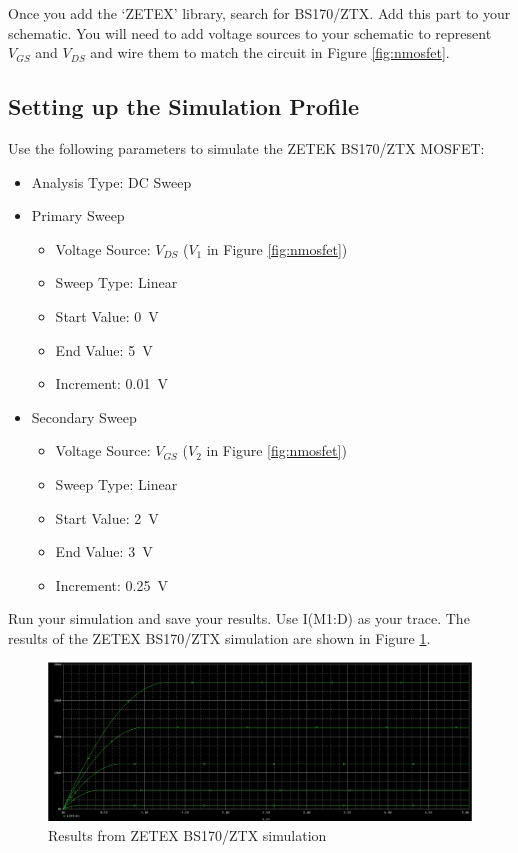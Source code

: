 \documentclass[12pt]{../manual}
\begin{document}
Once you add the `ZETEX’ library, search for BS170/ZTX. Add this part to your schematic. You will need to add voltage sources to your schematic to represent $V_{GS}$ and $V_{DS}$ and wire them to match the circuit in Figure \ref{fig:nmosfet}.

\newpage
\subsection{Setting up the Simulation Profile}
\label{sim}
Use the following parameters to simulate the ZETEK BS170/ZTX MOSFET:
\begin{itemize}
\item Analysis Type: DC Sweep
\item Primary Sweep
\begin{itemize}
\item Voltage Source: $V_{DS}$ ($V_1$ in Figure \ref{fig:nmosfet}) 
\item Sweep Type: Linear
\item Start Value: \SI{0}{\volt}
\item End Value: \SI{5}{\volt}
\item Increment: \SI{0.01}{\volt} 
\end{itemize}
\item Secondary Sweep
\begin{itemize}
\item Voltage Source: $V_{GS}$ ($V_2$ in Figure \ref{fig:nmosfet}) 
\item Sweep Type: Linear
\item Start Value: \SI{2}{\volt}
\item End Value: \SI{3}{\volt}
\item Increment: \SI{0.25}{\volt}
\end{itemize}
\end{itemize}


Run your simulation and save your results. Use I(M1:D) as your trace. The results of the ZETEX BS170/ZTX simulation are shown in Figure \ref{fig:zetexsim}.

\begin{figure}[ht!]
\begin{center}
\includegraphics[width=\textwidth]{figures/simulationBase}
\end{center}
\caption{Results from ZETEX BS170/ZTX simulation}
\label{fig:zetexsim}
\end{figure}
\end{document}
